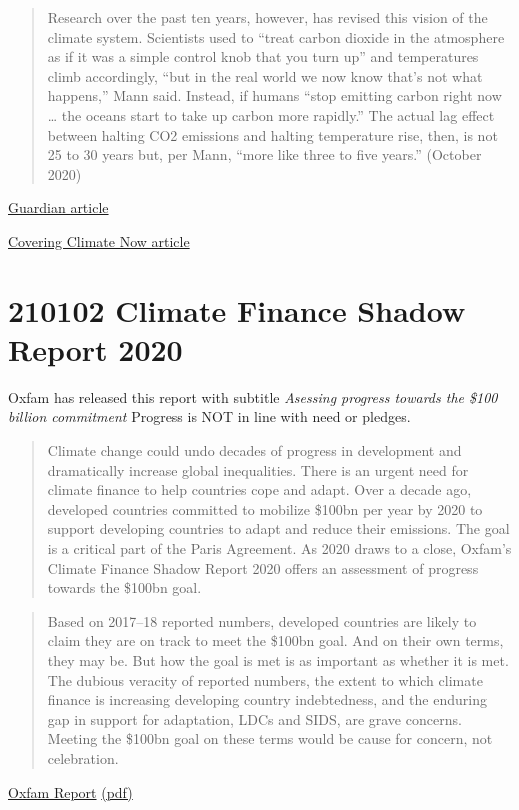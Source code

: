 \documentclass[
]{book}
\begin{document}
\begin{quote}
Research over the past ten years, however, has revised this vision of the climate system. Scientists used to ``treat carbon dioxide in the atmosphere as if it was a simple control knob that you turn up'' and temperatures climb accordingly, ``but in the real world we now know that's not what happens,'' Mann said. Instead, if humans ``stop emitting carbon right now \ldots{} the oceans start to take up carbon more rapidly.'' The actual lag effect between halting CO2 emissions and halting temperature rise, then, is not 25 to 30 years but, per Mann, ``more like three to five years.''
(October 2020)
\end{quote}

\href{https://www.theguardian.com/us-news/2020/oct/02/donald-trump-climate-change-michael-mann-interview}{Guardian article}

\href{https://www.cjr.org/covering_climate_now/michael-mann-60-minutes-emissions-warming.php}{Covering Climate Now article}

\hypertarget{climate-finance-shadow-report-2020}{%
\section{210102 Climate Finance Shadow Report 2020}\label{climate-finance-shadow-report-2020}}

Oxfam has released this report with subtitle \emph{Asessing progress towards the \$100 billion commitment}
Progress is NOT in line with need or pledges.

\begin{quote}
Climate change could undo decades of progress in development and dramatically increase global inequalities. There is an urgent need for climate finance to help countries cope and adapt.
Over a decade ago, developed countries committed to mobilize \$100bn per year by 2020 to support developing countries to adapt and reduce their emissions. The goal is a critical part of the Paris Agreement.
As 2020 draws to a close, Oxfam's Climate Finance Shadow Report 2020 offers an assessment of progress towards the \$100bn goal.
\end{quote}

\begin{quote}
Based on 2017--18 reported numbers, developed countries are likely to claim they are on track to meet
the \$100bn goal. And on their own terms, they may be. But how the goal is met is as important as whether
it is met. The dubious veracity of reported numbers, the extent to which climate finance is increasing
developing country indebtedness, and the enduring gap in support for adaptation, LDCs and SIDS, are grave
concerns. Meeting the \$100bn goal on these terms would be cause for concern, not celebration.
\end{quote}

\href{https://www.oxfam.org/en/research/climate-finance-shadow-report-2020}{Oxfam Report}
\href{/pdf/Oxfam_2020_Climate_Finance_Shadow_Report.pdf}{(pdf)}

  
\end{document}
